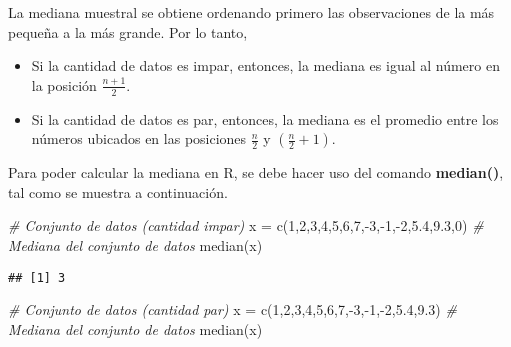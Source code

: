 \documentclass[
]{book}
\newenvironment{Shaded}{\begin{snugshade}}{\end{snugshade}}
\newcommand{\CommentTok}[1]{\textcolor[rgb]{0.56,0.35,0.01}{\textit{#1}}}
\newcommand{\DecValTok}[1]{\textcolor[rgb]{0.00,0.00,0.81}{#1}}
\newcommand{\FloatTok}[1]{\textcolor[rgb]{0.00,0.00,0.81}{#1}}
\newcommand{\FunctionTok}[1]{\textcolor[rgb]{0.00,0.00,0.00}{#1}}
\newcommand{\NormalTok}[1]{#1}
\newcommand{\OtherTok}[1]{\textcolor[rgb]{0.56,0.35,0.01}{#1}}
\newcommand{\SpecialCharTok}[1]{\textcolor[rgb]{0.00,0.00,0.00}{#1}}
\providecommand{\tightlist}{%
  \setlength{\itemsep}{0pt}\setlength{\parskip}{0pt}}
\theoremstyle{definition}
\theoremstyle{definition}
\theoremstyle{definition}
\theoremstyle{definition}
\theoremstyle{remark}
\begin{document}
La mediana muestral se obtiene ordenando primero las observaciones de la más pequeña a la más grande. Por lo tanto,

\begin{itemize}
\tightlist
\item
  Si la cantidad de datos es impar, entonces, la mediana es igual al número en la posición \(\frac{n+1}{2}\).
\item
  Si la cantidad de datos es par, entonces, la mediana es el promedio entre los números ubicados en las posiciones \(\frac{n}{2}\) y \((\frac{n}{2}+1)\).
\end{itemize}

Para poder calcular la mediana en R, se debe hacer uso del comando \textbf{median()}, tal como se muestra a continuación.

\begin{Shaded}
\begin{Highlighting}[]
\CommentTok{\# Conjunto de datos (cantidad impar)}
\NormalTok{x }\OtherTok{=} \FunctionTok{c}\NormalTok{(}\DecValTok{1}\NormalTok{,}\DecValTok{2}\NormalTok{,}\DecValTok{3}\NormalTok{,}\DecValTok{4}\NormalTok{,}\DecValTok{5}\NormalTok{,}\DecValTok{6}\NormalTok{,}\DecValTok{7}\NormalTok{,}\SpecialCharTok{{-}}\DecValTok{3}\NormalTok{,}\SpecialCharTok{{-}}\DecValTok{1}\NormalTok{,}\SpecialCharTok{{-}}\DecValTok{2}\NormalTok{,}\FloatTok{5.4}\NormalTok{,}\FloatTok{9.3}\NormalTok{,}\DecValTok{0}\NormalTok{)}
\CommentTok{\# Mediana del conjunto de datos}
\FunctionTok{median}\NormalTok{(x)}
\end{Highlighting}
\end{Shaded}

\begin{verbatim}
## [1] 3
\end{verbatim}

\begin{Shaded}
\begin{Highlighting}[]
\CommentTok{\# Conjunto de datos (cantidad par)}
\NormalTok{x }\OtherTok{=} \FunctionTok{c}\NormalTok{(}\DecValTok{1}\NormalTok{,}\DecValTok{2}\NormalTok{,}\DecValTok{3}\NormalTok{,}\DecValTok{4}\NormalTok{,}\DecValTok{5}\NormalTok{,}\DecValTok{6}\NormalTok{,}\DecValTok{7}\NormalTok{,}\SpecialCharTok{{-}}\DecValTok{3}\NormalTok{,}\SpecialCharTok{{-}}\DecValTok{1}\NormalTok{,}\SpecialCharTok{{-}}\DecValTok{2}\NormalTok{,}\FloatTok{5.4}\NormalTok{,}\FloatTok{9.3}\NormalTok{)}
\CommentTok{\# Mediana del conjunto de datos}
\FunctionTok{median}\NormalTok{(x)}
\end{Highlighting}
\end{Shaded}
\end{document}
